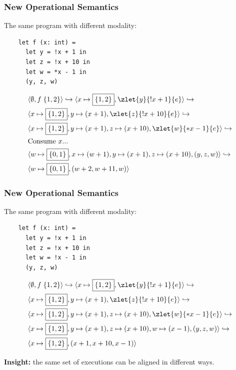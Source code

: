 \begin{frame}[fragile]
    \frametitle{New Operational Semantics}

The same program with different modality:
\begin{verbatim}
    let f (x: int) = 
      let y = !x + 1 in
      let z = !x + 10 in
      let w = *x - 1 in
      (y, z, w)
\end{verbatim}
       
\begin{align*}
      &\store{\emptyset, f\;\{1,2\}} \hookrightarrow \store{x\mapsto\boxed{\{1,2\}}, \zlet{y}{!x + 1}{e}} \hookrightarrow
    \\&\store{x\mapsto\boxed{\{1,2\}}, y\mapsto (x + 1), \zlet{z}{!x + 10}{e}} \hookrightarrow
    \\&\store{x\mapsto\boxed{\{1,2\}}, y\mapsto (x + 1), z\mapsto (x+10), \zlet{w}{*x - 1}{e}} \hookrightarrow
    \\&\text{Consume $x$...}
    \\&\store{w\mapsto\boxed{\{0,1\}}, x\mapsto(w + 1), y\mapsto (x + 1), z\mapsto (x+10), (y, z, w)} \hookrightarrow
    \\&\store{w\mapsto\boxed{\{0,1\}}, (w+2, w+11, w)}
\end{align*}

\end{frame}

\begin{frame}[fragile]
    \frametitle{New Operational Semantics}

The same program with different modality:
\begin{verbatim}
    let f (x: int) = 
      let y = !x + 1 in
      let z = !x + 10 in
      let w = !x - 1 in
      (y, z, w)
\end{verbatim}
       
\begin{align*}
      &\store{\emptyset, f\;\{1,2\}} \hookrightarrow \store{x\mapsto\boxed{\{1,2\}}, \zlet{y}{!x + 1}{e}} \hookrightarrow
    \\&\store{x\mapsto\boxed{\{1,2\}}, y\mapsto (x + 1), \zlet{z}{!x + 10}{e}} \hookrightarrow
    \\&\store{x\mapsto\boxed{\{1,2\}}, y\mapsto (x + 1), z\mapsto (x+10), \zlet{w}{*x - 1}{e}} \hookrightarrow
    \\&\store{x\mapsto\boxed{\{1,2\}}, y\mapsto (x + 1), z\mapsto (x+10), w\mapsto (x - 1), (y, z, w)} \hookrightarrow
    \\&\store{x\mapsto\boxed{\{1,2\}}, (x+1, x+10, x-1)}
\end{align*}

\textbf{Insight:} the same set of executions can be aligned in different ways.

\end{frame}

